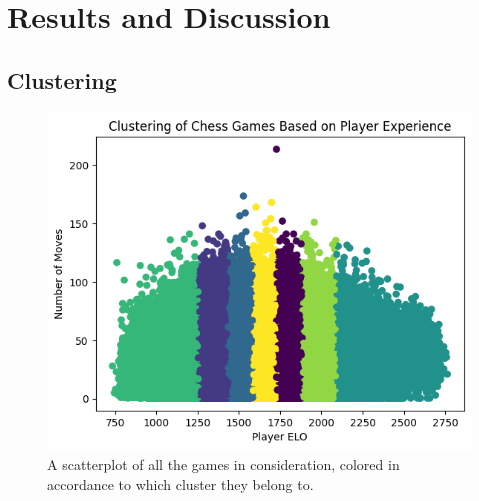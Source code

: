 \documentclass[conference]{IEEEtran}
\begin{document}

\section{Results and Discussion}

\subsection{Clustering}

\begin{figure}[htbp]
\centerline{\includegraphics[scale=0.5]{Clustering of Chess Games Based on Experience.png}}
\label{fig:cluster-results}
\caption{A scatterplot of all the games in consideration, colored in accordance to which cluster they belong to.}
\end{figure}
\end{document}
